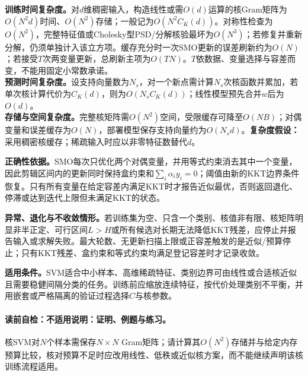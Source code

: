 \label{struct:V3-C02-CH26}
\label{struct:V3-C02-CH27}
\begin{complexitybox}
\textbf{训练时间复杂度。}对$d$维稠密输入，构造线性或需$O(d)$运算的核Gram矩阵为$O(N^2d)$时间、$O(N^2)$存储；一般记为$O(N^2C_K(d))$。对称性检查为$O(N^2)$，完整特征值或Cholesky型PSD/分解核验最坏为$O(N^3)$；若修复并重新分解，仍须单独计入该立方项。缓存充分时一次SMO更新的误差刷新约为$O(N)$；若接受$T$次两变量更新，总刷新主项为$O(TN)$。$T$依数据、变量选择与容差而变，不能用固定小常数承诺。\\
\textbf{预测时间复杂度。}设支持向量数为$N_s$，对一个新点需计算$N_s$次核函数并累加，若单次核计算代价为$C_K(d)$，则为$O(N_sC_K(d))$；线性模型预先合并$w$后为$O(d)$。\\
\textbf{存储与空间复杂度。}完整核矩阵需$O(N^2)$空间，受限缓存可降至$O(NB)$；对偶变量和误差缓存为$O(N)$，部署模型保存支持向量约为$O(N_sd)$。\textbf{复杂度假设：}采用稠密核缓存；稀疏输入时应以非零特征数替代$d$。

\textbf{正确性依据。}SMO每次只优化两个对偶变量，并用等式约束消去其中一个变量，因此剪辑区间内的更新同时保持盒约束和$\sum_i\alpha_i y_i=0$；阈值由新的KKT边界条件恢复。只有所有变量在给定容差内满足KKT时才报告近似最优，否则返回退化、停滞或达到迭代上限但未满足KKT的状态。

\textbf{异常、退化与不收敛情形。}若训练集为空、只含一个类别、核值非有限、核矩阵明显非半正定、可行区间$L>H$或所有候选对长期无法降低KKT残差，应停止并报告输入或求解失败。最大轮数、无更新扫描上限或正容差触发的是近似/预算停止；只有KKT残差、盒约束和等式约束均满足登记容差时才记录收敛。
\end{complexitybox}

\label{struct:V3-C02-CH28}
\begin{applicabilitybox}
\textbf{适用条件。}SVM适合中小样本、高维稀疏特征、类别边界可由线性或合适核近似且需要稳健间隔分类的任务。训练前应缩放连续特征，按代价处理类别不平衡，并用嵌套或严格隔离的验证过程选择$C$与核参数。
\end{applicabilitybox}

\label{struct:V3-C02-CH29}
\paragraph{读前自检：不适用说明：证明、例题与练习。}核SVM对$N$个样本需保存$N\times N$ Gram矩阵；请计算其$O(N^2)$存储并与给定内存预算比较，核对预算不足时应改用线性、低秩或近似核方案，而不能继续声明该核训练流程适用。\par

